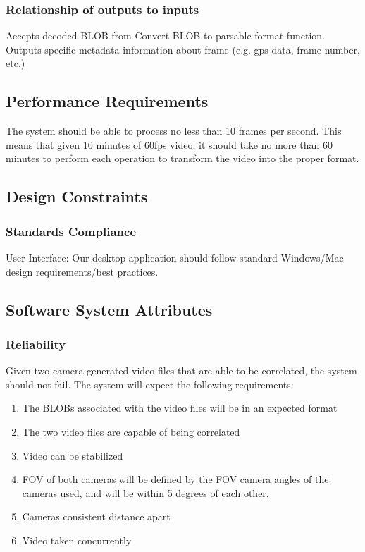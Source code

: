 \documentclass[10pt,letterpaper,onecolumn]{article}
\begin{document}
\subsubsection*{Relationship of outputs to inputs}
Accepts decoded BLOB from Convert BLOB to parsable format function.
Outputs specific metadata information about frame (e.g. gps data, frame number, etc.)

\subsection{Performance Requirements}
The system should be able to process no less than 10 frames per second.
This means that given 10 minutes of 60fps video, it should take no more than 60 minutes to perform each operation to transform the video into the proper format.

\subsection{Design Constraints}
\subsubsection{Standards Compliance}
User Interface: Our desktop application should follow standard Windows/Mac design requirements/best practices.

\subsection{Software System Attributes}
\subsubsection{Reliability}
Given two camera generated video files that are able to be correlated, the system should not fail.
The system will expect the following requirements:
\begin{enumerate}
  \item The BLOBs associated with the video files will be in an expected format
  \item The two video files are capable of being correlated
  \item Video can be stabilized
  \item FOV of both cameras will be defined by the FOV camera angles of the cameras used, and will be within 5 degrees of each other.
  \item Cameras consistent distance apart
  \item Video taken concurrently
\end{enumerate}
\end{document}
